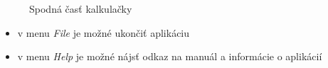 \documentclass[a4paper, 11pt]{article}
\begin{document}
    \begin{figure}[!h]
        \centering
        \caption{Spodná časť kalkulačky}
        \label{fig:obrazok2}
    \end{figure}
    
    \begin{itemize}
        \item v menu \emph{File} je možné ukončiť aplikáciu
        \item v menu \emph{Help} je možné nájsť odkaz na manuál a informácie o aplikácií
    \end{itemize}
    \newpage
\end{document}
